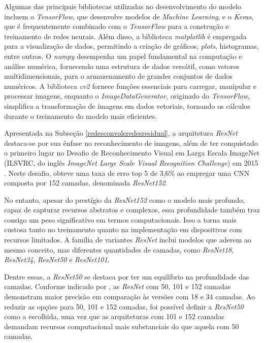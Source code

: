 Algumas das principais bibliotecas utilizadas no desenvolvimento do modelo incluem o \textit{TensorFlow}, que desenvolve modelos de \textit{Machine Learning}, e o \textit{Keras}, que é frequentemente combinado com o \textit{TensorFlow} para a construção e treinamento de redes neurais. Além disso, a biblioteca \textit{matplotlib} é empregada para a visualização de dados, permitindo a criação de gráficos, \textit{plots}, histogramas, entre outros. O \textit{numpy} desempenha um papel fundamental na computação e análise numérica, fornecendo uma estrutura de dados versátil, como vetores multidimensionais, para o armazenamento de grandes conjuntos de dados numéricos. A biblioteca \textit{cv2} fornece funções essenciais para carregar, manipular e processar imagens, enquanto o \textit{ImageDataGenerator}, originado do \textit{TensorFlow}, simplifica a transformação de imagens em dados vetoriais, tornando os cálculos durante o treinamento do modelo mais eficientes.

Apresentada na Subseção \ref{redesconvoleredesresidual}, a arquitetura \textit{ResNet} destaca-se por sua ênfase no reconhecimento de imagens, além de ter conquistado o primeiro lugar no Desafio de Reconhecimento Visual em Larga Escala ImageNet (ILSVRC, do inglês \textit{ImageNet Large Scale Visual Recognition Challenge}) em 2015 \cite{resnet50analisys}. Neste desafio, obteve uma taxa de erro top 5 de 3,6\% ao empregar uma CNN composta por 152 camadas, denominada \textit{ResNet152}.

No entanto, apesar do prestígio da \textit{ResNet152} como o modelo mais profundo, capaz de capturar recursos abstratos e complexos, essa profundidade também traz consigo um peso significativo em termos computacionais. Isso a torna mais custosa tanto no treinamento quanto na implementação em dispositivos com recursos limitados. A família de variantes \textit{ResNet} inclui modelos que aderem ao mesmo conceito, mas diferentes quantidades de camadas, como \textit{ResNet18}, \textit{ResNet34}, \textit{ResNet50} e \textit{ResNet101}. 

Dentre essas, a \textit{ResNet50} se destaca por ter um equilíbrio na profundidade das camadas. Conforme indicado por , as \textit{ResNet} com 50, 101 e 152 camadas demonstram maior precisão em comparação às versões com 18 e 34 camadas. Ao reduzir as opções para 50, 101 e 152 camadas, foi possível definir a \textit{ResNet50} como a escolhida, uma vez que as arquiteturas com 101 e 152 camadas demandam recursos computacional mais substanciais do que aquela com 50 camadas.



